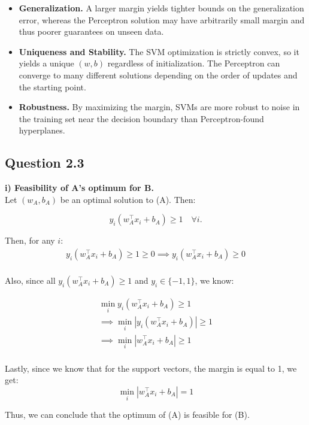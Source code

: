 \documentclass[a4paper]{article}
\begin{document}
\begin{itemize}[itemsep=1ex]
  \item \textbf{Generalization.}  A larger margin yields tighter bounds on the generalization error, whereas the Perceptron solution may have arbitrarily small margin and thus poorer guarantees on unseen data.
  \item \textbf{Uniqueness and Stability.}  The SVM optimization is strictly convex, so it yields a unique \((w,b)\) regardless of initialization.  The Perceptron can converge to many different solutions depending on the order of updates and the starting point.
  \item \textbf{Robustness.}  By maximizing the margin, SVMs are more robust to noise in the training set near the decision boundary than Perceptron-found hyperplanes.
\end{itemize}

\subsection*{Question 2.3}
\textbf{i) Feasibility of A's optimum for B.}\\

\noindent Let \((w_A,b_A)\) be an optimal solution to (A). Then:

\[
    y_i\left(w_A^\top x_i + b_A\right) \ge 1
    \quad\forall i.
\]

\noindent Then, for any \(i\):
\begin{align*}
    y_i\left(w_A^\top x_i + b_A\right) \ge 1 \ge 0 \implies y_i\left(w_A^\top x_i + b_A\right) \ge 0 \\
\end{align*}

\noindent Also, since all $y_i\left(w_A^\top x_i + b_A\right) \ge 1$ and $y_i \in \{-1, 1\}$, we know:

\begin{align*}
    \min_i  y_i\left(w_A^\top x_i + b_A\right) \ge 1 \\
    \implies \min_i |y_i\left(w_A^\top x_i + b_A\right)| \ge 1 \\
    \implies \min_i |w_A^\top x_i + b_A| \ge 1 \\
\end{align*}

\noindent Lastly, since we know that for the support vectors, the margin is equal to 1, we get:
\[ \min_i |w_A^\top x_i + b_A| = 1 \]

\noindent Thus, we can conclude that the optimum of (A) is feasible for (B).\\
\end{document}
